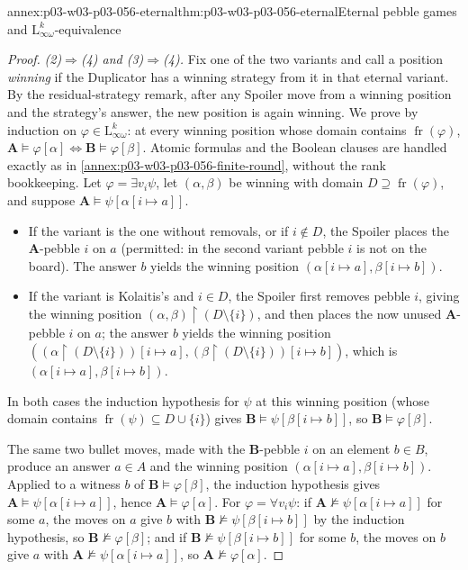 \begin{annexitem}{annex:p03-w03-p03-056-eternal}{thm:p03-w03-p03-056-eternal}{Eternal pebble games and \(\mathrm{L}^k_{\infty\omega}\)-equivalence}
\begin{proof}
\emph{(2)\(\Rightarrow\)(4) and (3)\(\Rightarrow\)(4).} Fix one of the two
variants and call a position \emph{winning} if the Duplicator has a winning
strategy from it in that eternal variant. By the residual-strategy remark,
after any Spoiler move from a winning position and the strategy's answer,
the new position is again winning. We prove by induction on
\(\varphi\in\mathrm{L}^k_{\infty\omega}\): at every winning position whose
domain contains \(\operatorname{fr}(\varphi)\),
\(\mathbf A\models\varphi[\alpha]\iff\mathbf B\models\varphi[\beta]\).
Atomic formulas and the Boolean clauses are handled exactly as in
\cref{annex:p03-w03-p03-056-finite-round}, without the rank bookkeeping.
Let \(\varphi=\exists v_i\psi\), let \((\alpha,\beta)\) be winning with
domain \(D\supseteq\operatorname{fr}(\varphi)\), and suppose
\(\mathbf A\models\psi[\alpha[i\mapsto a]]\).
\begin{itemize}
\item If the variant is the one without removals, or if \(i\notin D\), the
      Spoiler places the \(\mathbf A\)-pebble \(i\) on \(a\) (permitted:
      in the second variant pebble \(i\) is not on the board). The answer
      \(b\) yields the winning position
      \((\alpha[i\mapsto a],\beta[i\mapsto b])\).
\item If the variant is Kolaitis's and \(i\in D\), the Spoiler first removes
      pebble \(i\), giving the winning position
      \((\alpha,\beta)\restriction(D\setminus\{i\})\), and then places the
      now unused \(\mathbf A\)-pebble \(i\) on \(a\); the answer \(b\)
      yields the winning position
      \(((\alpha\restriction(D\setminus\{i\}))[i\mapsto a],
      (\beta\restriction(D\setminus\{i\}))[i\mapsto b])\), which is
      \((\alpha[i\mapsto a],\beta[i\mapsto b])\).
\end{itemize}
In both cases the induction hypothesis for \(\psi\) at this winning position
(whose domain contains \(\operatorname{fr}(\psi)\subseteq D\cup\{i\}\)) gives
\(\mathbf B\models\psi[\beta[i\mapsto b]]\), so
\(\mathbf B\models\varphi[\beta]\).

The same two bullet moves, made with the \(\mathbf B\)-pebble \(i\) on an
element \(b\in B\), produce an answer \(a\in A\) and the winning position
\((\alpha[i\mapsto a],\beta[i\mapsto b])\). Applied to a witness \(b\) of
\(\mathbf B\models\varphi[\beta]\), the induction hypothesis gives
\(\mathbf A\models\psi[\alpha[i\mapsto a]]\), hence
\(\mathbf A\models\varphi[\alpha]\). For \(\varphi=\forall v_i\psi\): if
\(\mathbf A\not\models\psi[\alpha[i\mapsto a]]\) for some \(a\), the moves
on \(a\) give \(b\) with \(\mathbf B\not\models\psi[\beta[i\mapsto b]]\) by
the induction hypothesis, so \(\mathbf B\not\models\varphi[\beta]\); and if
\(\mathbf B\not\models\psi[\beta[i\mapsto b]]\) for some \(b\), the moves on
\(b\) give \(a\) with \(\mathbf A\not\models\psi[\alpha[i\mapsto a]]\), so
\(\mathbf A\not\models\varphi[\alpha]\).


\end{proof}
\end{annexitem}
